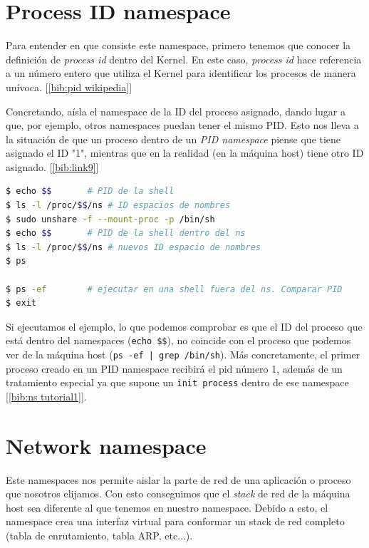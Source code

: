 \documentclass[a4paper, oneside, 12pt]{book}
\begin{document}
	\pagebreak
	
	\section{Process ID namespace}
	\par \noindent Para entender en que consiste este namespace, primero tenemos que conocer la definición de \textit{process id} dentro del Kernel. En este caso, \textit{process id} hace referencia a un número entero que utiliza el Kernel para identificar los procesos de manera unívoca. [\ref{bib:pid wikipedia}] \\
	
	\par \noindent Concretando, aísla el namespace de la ID del proceso asignado, dando lugar a que, por ejemplo, otros namespaces puedan tener el mismo PID. Esto nos lleva a la situación de que un proceso dentro de un \textit{PID namespace} piense que tiene asignado el ID "1", mientras que en la realidad (en la máquina host) tiene otro ID asignado. [\ref{bib:link9}]
	
	\addvspace{10px}
	
	\begin{lstlisting}[language=bash, caption=Uso de process id namespace]
$ echo $$		# PID de la shell
$ ls -l /proc/$$/ns	# ID espacios de nombres 
$ sudo unshare -f --mount-proc -p /bin/sh
$ echo $$		# PID de la shell dentro del ns
$ ls -l /proc/$$/ns	# nuevos ID espacio de nombres
$ ps

$ ps -ef 		# ejecutar en una shell fuera del ns. Comparar PID
$ exit
	\end{lstlisting}

	\addvspace{10px}
	
	\par \noindent Si ejecutamos el ejemplo, lo que podemos comprobar es que el ID del proceso que está dentro del namespaces (\texttt{echo \$\$}), no coincide con el proceso que podemos ver de la máquina host (\texttt{ps -ef | grep /bin/sh}). Más concretamente, el primer proceso creado en un PID namespace recibirá el pid número 1, además de un tratamiento especial ya que supone  un \texttt{init process} dentro de ese namespace [\ref{bib:ns tutorial1}].
	
	\pagebreak
	
	\section{Network namespace}
	\par \noindent Este namespaces nos permite aislar la parte de red de una aplicación o proceso que nosotros elijamos. Con esto conseguimos que el \textit{stack} de red de la máquina host sea diferente al que tenemos en nuestro namespace. Debido a esto, el namespace crea una interfaz virtual para conformar un stack de red completo (tabla de enrutamiento, tabla ARP, etc...).\\
	
\end{document}
